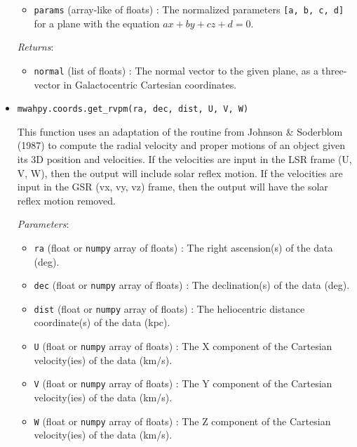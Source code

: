 \documentclass{article}
\begin{document}
\begin{itemize}
\begin{itemize}
\item \verb!params! (array-like of floats) : The normalized parameters \verb![a, b, c, d]! for a plane with the equation $ax + by + cz + d = 0$.

\end{itemize}

\textit{Returns}: \begin{itemize}

\item \verb!normal! (list of floats) : The normal vector to the given plane, as a three-vector in Galactocentric Cartesian coordinates.

\end{itemize}



\item \verb!mwahpy.coords.get_rvpm(ra, dec, dist, U, V, W)!

This function uses an adaptation of the routine from Johnson \& Soderblom (1987) to compute the radial velocity and proper motions of an object given its 3D position and velocities. If the velocities are input in the LSR frame (U, V, W), then the output will include solar reflex motion. If the velocities are input in the GSR (vx, vy, vz) frame, then the output will have the solar reflex motion removed. 

\textit{Parameters}: \begin{itemize}

\item \verb!ra! (float or \verb!numpy! array of floats) : The right ascension(s) of the data (deg).

\item \verb!dec! (float or \verb!numpy! array of floats) : The declination(s) of the data (deg).

\item \verb!dist! (float or \verb!numpy! array of floats) : The heliocentric distance coordinate(s) of the data (kpc).

\item \verb!U! (float or \verb!numpy! array of floats) : The X component of the Cartesian velocity(ies) of the data (km/s).

\item \verb!V! (float or \verb!numpy! array of floats) : The Y component of the Cartesian velocity(ies) of the data (km/s).

\item \verb!W! (float or \verb!numpy! array of floats) : The Z component of the Cartesian velocity(ies) of the data (km/s).


\end{itemize}
\end{itemize}
\end{document}
